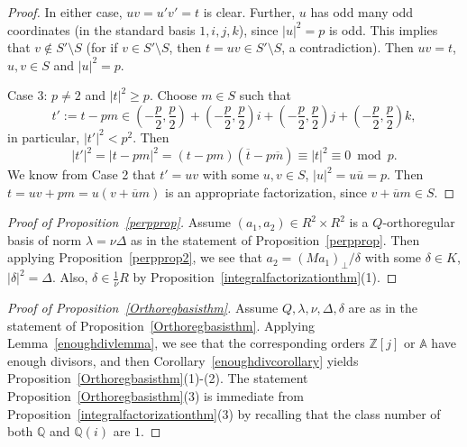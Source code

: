 \documentclass[11pt]{amsart}
\newcommand{\ZZ}{\mathbb{Z}}
\newcommand{\QQ}{\mathbb{Q}}
\theoremstyle{definition}
\theoremstyle{remark}
\begin{document}
\begin{proof}
In either case, $uv=u'v'=t$ is clear. Further, $u$ has odd many odd coordinates (in the standard basis $1,i,j,k$), since $|u|^2=p$ is odd. This implies that $v\notin S'\setminus S$ (for if $v\in S'\setminus S$, then $t=uv\in S'\setminus S$, a contradiction). Then $uv=t$, $u,v\in S$ and $|u|^2=p$.

Case 3: $p\neq 2$ and $|t|^2\geq p$. Choose $m\in S$ such that
\[
t':=t-pm\in \left(-\frac{p}{2},\frac{p}{2}\right) + \left(-\frac{p}{2},\frac{p}{2}\right)i+ \left(-\frac{p}{2},\frac{p}{2}\right)j+\left(-\frac{p}{2},\frac{p}{2}\right)k,
\]
in particular, $|t'|^2<p^2$. Then \[|t'|^2=|t-pm|^2=(t-pm)(\overline t-p\overline m)\equiv |t|^2\equiv 0 \bmod p.\] We know from Case 2 that $t'=uv$ with some $u,v\in S$, $|u|^2=u\overline u=p$. Then $t=uv+pm=u(v+\overline{u}m)$ is an appropriate factorization, since $v+\overline{u}m\in S$.
\end{proof}



\begin{proof}[Proof of Proposition~\ref{perpprop}]
Assume $(a_1,a_2)\in R^2\times R^2$ is a $Q$-orthoregular basis of norm $\lambda=\nu\Delta$ as in the statement of Proposition~\ref{perpprop}. Then applying Proposition~\ref{perpprop2}, we see that $a_2=(Ma_1)_{\perp}/\delta$ with some $\delta\in K$, $|\delta|^2=\Delta$. Also, $\delta\in\frac{1}{\nu} R$ by Proposition~\ref{integralfactorizationthm}(1).
\end{proof}

\begin{proof}[Proof of Proposition~\ref{Orthoregbasisthm}]
Assume $Q,\lambda,\nu,\Delta,\delta$ are as in the statement of Proposition~\ref{Orthoregbasisthm}. Applying Lemma~\ref{enoughdivlemma}, we see that the corresponding orders $\ZZ[j]$ or $\mathbb{A}$ have enough divisors, and then Corollary~\ref{enoughdivcorollary} yields Proposition~\ref{Orthoregbasisthm}(1)-(2). The statement Proposition~\ref{Orthoregbasisthm}(3) is immediate from Proposition~\ref{integralfactorizationthm}(3) by recalling that the class number of both $\QQ$ and $\QQ(i)$ are $1$.
\end{proof}
\end{document}
